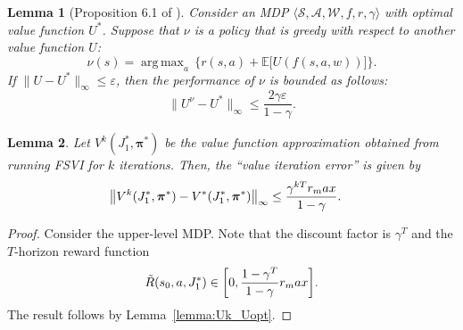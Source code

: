 \documentclass[11pt, notitlepage]{article}
\DeclareMathOperator*{\argmax}{arg\,max}
\newcommand{\E}{\mathbb{E}}
\newcommand{\1}{\mathbbm{1}}
\newtheorem{lemma}{Lemma}[section]
\begin{document}
\begin{lemma}[Proposition 6.1 of \cite{bertsekas1996neuro}]
    \label{lemma:Ugreedy_Uopt}
    Consider an MDP $\langle \mathcal{S}, \mathcal{A}, \mathcal{W}, f, r, \gamma \rangle$ with optimal value function $U^*$. Suppose that $\nu$ is a policy that is greedy with respect to another value function $U$:
    \[
    \nu(s) = \argmax_{a} \, \bigl \{ r(s,a) + \E\bigl[ U(f(s,a,w)) \bigr] \bigr\}.
    \]
    If $\|U - U^*\|_\infty \leq \varepsilon$, then the performance of $\nu$ is bounded as follows:
    \[
    \|U^{\nu} - U^*\|_\infty \leq \frac{2 \gamma \varepsilon}{1-\gamma}.
    \]
\end{lemma}

\begin{lemma}
    \label{prop:K2}
    Let $V^k(J_1^*,\boldsymbol{\pi}^*)$ be the value function approximation obtained from running FSVI for $k$ iterations. Then, the ``value iteration error'' is given by
    \begin{align*}
    \bigl \|V^{k}(J_1^*,\boldsymbol{\pi}^*) - V^*(J_1^*,\boldsymbol{\pi}^*) \bigr\|_\infty 
    &\leq \frac{\gamma^{kT} r_\textnormal{max}}{1-\gamma}.
    \end{align*}
\end{lemma}
\begin{proof}
Consider the upper-level MDP. Note that the discount factor is $\gamma^T$ and the $T$-horizon reward function
\[
\tilde{R}(s_0, a, J_1^*) \in \biggl[0, \frac{1-\gamma^T}{1-\gamma}r_\textnormal{max}\biggr].
\]
The result follows by Lemma~\ref{lemma:Uk_Uopt}.
\end{proof}
\end{document}
